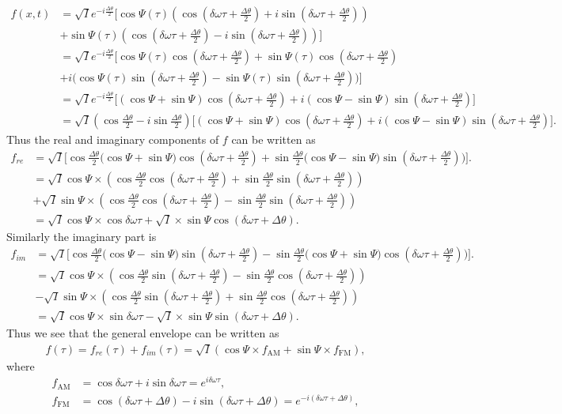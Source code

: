 \documentclass[10pt,letterpaper]{article}
\def\dw{\delta\omega}
\def\dth{\Delta\theta}
\def\Hdth{\frac{\dth}{2}} %
\begin{document}
\begin{align}
f(x,t) &= \sqrt{I} e^{-i\frac{\dth}{2}} \Big [\cos\Psi(\tau) (\cos (\dw\tau+ \frac{\dth}{2}) + i \sin(\dw\tau + \frac{\dth}{2})) \nonumber \\
&+  \sin\Psi(\tau)(\cos (\dw\tau + \frac{\dth}{2}) - i \sin(\dw\tau + \frac{\dth}{2})) \Big ] \nonumber \\ \label{eq:phasor_f_03}
&=\sqrt{I}e^{-i\frac{\dth}{2}} \Big[ \cos\Psi(\tau)\cos (\dw\tau+ \frac{\dth}{2}) + \sin\Psi(\tau)\cos (\dw\tau + \frac{\dth}{2}) \nonumber \\
&+ i\big(\cos\Psi(\tau) \sin(\dw\tau + \frac{\dth}{2})  - \sin\Psi(\tau)\sin(\dw\tau + \frac{\dth}{2})\big)\Big] \nonumber \\
&= \sqrt{I} e^{-i\frac{\dth}{2}}\Big[(\cos\Psi+\sin\Psi) \cos(\dw\tau+ \frac{\dth}{2})+i(\cos\Psi-\sin\Psi)\sin (\dw\tau+ \frac{\dth}{2}) \Big] \nonumber \\
&= \sqrt{I} (\cos\frac{\dth}{2}-i\sin\frac{\dth}{2})\Big[(\cos\Psi+\sin\Psi) \cos(\dw\tau+ \frac{\dth}{2})+i(\cos\Psi-\sin\Psi)\sin (\dw\tau+ \frac{\dth}{2}) \Big].
\end{align}  
Thus the real and imaginary components of $f$ can be written as
\begin{align}
f_{re} &= \sqrt{I} \Big[\cos\Hdth \big(\cos\Psi+\sin\Psi\big) \cos(\dw\tau+ \Hdth) + \sin\Hdth\big(\cos\Psi-\sin\Psi\big)\sin(\dw\tau+\Hdth) )\Big]. \nonumber \\
 &= \sqrt{I}\cos\Psi\times(\cos\Hdth \cos(\dw\tau+ \Hdth) + \sin\Hdth\sin(\dw\tau+\Hdth) ) \nonumber \\
 &+ \sqrt{I}\sin\Psi\times( \cos\Hdth \cos(\dw\tau+ \Hdth)-\sin\Hdth\sin(\dw\tau+\Hdth))\nonumber \\
 &=\sqrt{I}\cos\Psi\times\cos\dw\tau + \sqrt{I}\times\sin\Psi\cos(\dw\tau+\dth). 
\end{align}  
Similarly the imaginary part is 
\begin{align}
f_{im} &= \sqrt{I} \Big[\cos\Hdth \big(\cos\Psi-\sin\Psi\big) \sin(\dw\tau+ \Hdth) - \sin\Hdth\big(\cos\Psi+\sin\Psi\big)\cos(\dw\tau+\Hdth) )\Big]. \nonumber \\
&= \sqrt{I}\cos\Psi\times(\cos\Hdth \sin(\dw\tau+ \Hdth) - \sin\Hdth\cos(\dw\tau+\Hdth) ) \nonumber \\
&- \sqrt{I}\sin\Psi\times( \cos\Hdth \sin(\dw\tau+ \Hdth)+\sin\Hdth\cos(\dw\tau+\Hdth))\nonumber \\
&=\sqrt{I}\cos\Psi\times\sin\dw\tau - \sqrt{I}\times\sin\Psi\sin(\dw\tau+\dth). 
\end{align}  
Thus we see that the general envelope can be written as
\begin{align}
f(\tau) = f_{re}(\tau) +f_{im}(\tau) = \sqrt{I}\left(\cos\Psi \times f_{\text{AM}} + \sin\Psi \times f_{\text{FM}}\right),  
\end{align}
where 
\begin{align}
f_{\text{AM}} &= \cos\dw\tau+i\sin\dw\tau = e^{i\dw\tau}, \\
f_{\text{FM}} &= \cos(\dw\tau+\dth)-i\sin(\dw\tau+\dth) = e^{-i(\dw\tau+\dth)}, \\
\end{align}
\end{document}
